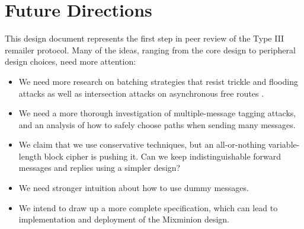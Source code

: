 \documentclass{llncs}
\renewcommand\url{\begingroup \def\UrlLeft{<}\def\UrlRight{>}\urlstyle{tt}\Url}
\begin{document}

\section{Future Directions}
\label{sec:conclusion}

This design document represents the first step in peer review of the
Type III remailer protocol. Many of the ideas, ranging from the core
design to peripheral design choices, need more attention:

\begin{itemize}
\item We need more research on batching strategies that resist trickle
and flooding attacks \cite{batching-taxonomy} as well as intersection
attacks on asynchronous free routes \cite{disad-free-routes}.
\item We need a more thorough investigation of multiple-message tagging
attacks, and an analysis of how to safely choose paths when
sending many messages.
\item We claim that we use conservative techniques, but an all-or-nothing
variable-length block cipher is pushing it. Can we keep indistinguishable
forward messages and replies using a simpler design?
\item We need stronger intuition about how to use
dummy messages.
\item We intend to draw up a more complete specification, which can lead
to implementation and deployment of the Mixminion design.
\end{itemize}








\end{document}
